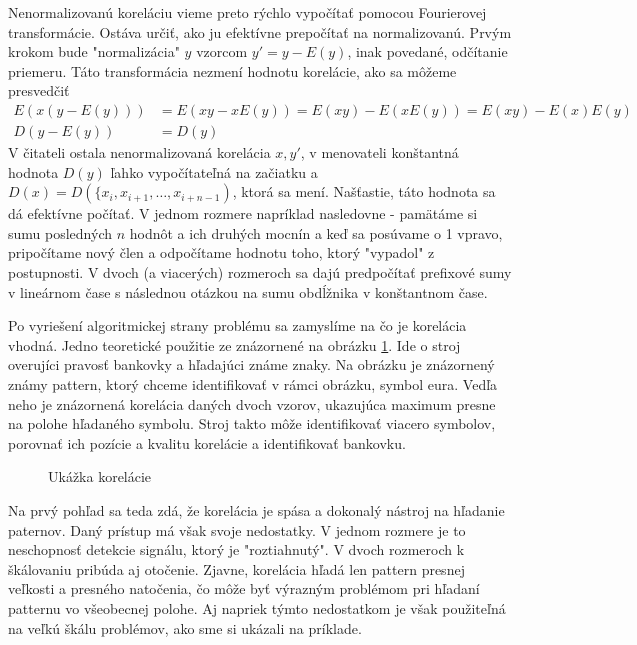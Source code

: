 Nenormalizovanú koreláciu vieme preto rýchlo vypočítať pomocou
Fourierovej transformácie. Ostáva určiť, ako ju efektívne prepočítať
na normalizovanú.
Prvým krokom bude "normalizácia" $y$ vzorcom $y' = y-E(y)$, inak povedané,
odčítanie priemeru. Táto transformácia nezmení hodnotu korelácie, ako
sa môžeme presvedčiť
\begin{align*}
    E(x (y-E(y))) &= E(x y - x E(y)) = E(xy) - E(x E(y)) = E(xy) -
    E(x)E(y) \\
    D(y - E(y)) &= D(y)
\end{align*}
V čitateli ostala nenormalizovaná korelácia $x,y'$, v menovateli
konštantná hodnota $D(y)$ ľahko vypočítateľná na začiatku a $D(x)=
D(\{x_i,x_{i+1},\dots,x_{i+n-1})$,
ktorá sa mení. Našťastie, táto hodnota sa dá efektívne počítať. V
jednom rozmere napríklad nasledovne - pamätáme si sumu posledných $n$
hodnôt a ich druhých mocnín a keď sa posúvame o 1 vpravo, pripočítame
nový člen a odpočítame hodnotu toho, ktorý "vypadol" z postupnosti. V
dvoch (a viacerých) rozmeroch sa dajú predpočítať prefixové sumy v
lineárnom čase s následnou otázkou na sumu obdĺžnika v konštantnom
čase.

Po vyriešení algoritmickej strany problému sa zamyslíme na čo je
korelácia vhodná. Jedno teoretické použitie ze znázornené na obrázku
\ref{fig:korelacia}. Ide o stroj overujíci pravosť bankovky a
hľadajúci známe znaky. Na obrázku je znázornený známy pattern, ktorý
chceme identifikovať v rámci obrázku, symbol eura. Vedľa neho je
znázornená korelácia daných dvoch vzorov, ukazujúca maximum presne na
polohe hľadaného symbolu. Stroj takto môže identifikovať viacero
symbolov, porovnať ich pozície a kvalitu korelácie a identifikovať
bankovku.
\begin{figure}[htp]
    \caption{Ukážka korelácie}
    \label{fig:korelacia}
\end{figure}

Na prvý pohľad sa teda zdá, že korelácia je spása a dokonalý nástroj
na hľadanie paternov. Daný prístup má však svoje nedostatky. V jednom
rozmere je to neschopnosť detekcie signálu, ktorý je "roztiahnutý". V
dvoch rozmeroch k škálovaniu pribúda aj otočenie. Zjavne, korelácia hľadá len
pattern presnej veľkosti a presného natočenia, čo môže byť výrazným
problémom pri hľadaní patternu vo všeobecnej polohe. Aj napriek týmto
nedostatkom je však použiteľná na veľkú škálu problémov, ako sme si
ukázali na príklade.


